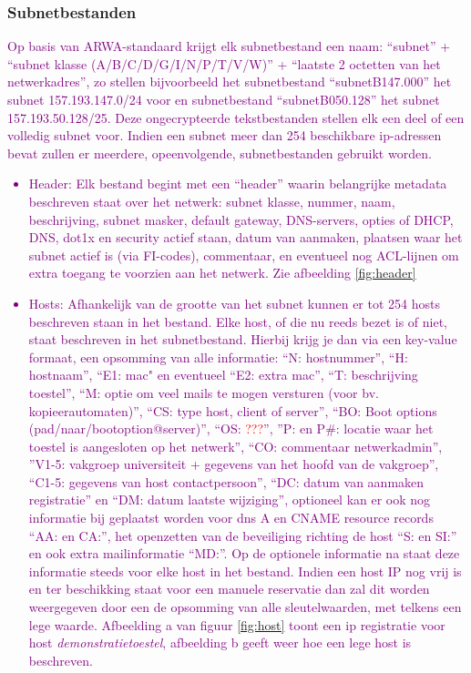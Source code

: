 \subsubsection{Subnetbestanden}
\label{subnetbestanden}
\textcolor{purple}{Op basis van ARWA-standaard krijgt elk subnetbestand een naam: “subnet” + “subnet klasse (A/B/C/D/G/I/N/P/T/V/W)” + “laatste 2 octetten van het netwerkadres”, zo stellen bijvoorbeeld het subnetbestand “subnetB147.000” het subnet 157.193.147.0/24 voor en subnetbestand “subnetB050.128” het subnet 157.193.50.128/25. Deze ongecrypteerde tekstbestanden stellen elk een deel of een volledig subnet voor. Indien een subnet meer dan 254 beschikbare \acrshort{ip}-adressen bevat zullen er meerdere, opeenvolgende, subnetbestanden gebruikt worden.}
\textcolor{purple}{
\begin{itemize}
    \item Header: Elk bestand begint met een “header” waarin belangrijke metadata beschreven staat over het netwerk: subnet klasse, nummer, naam, beschrijving, subnet masker, default gateway, DNS-servers, opties of DHCP, DNS, dot1x en security actief staan, datum van aanmaken, plaatsen waar het subnet actief is (via FI-codes), commentaar, en eventueel nog ACL-lijnen om extra toegang te voorzien aan het netwerk. Zie afbeelding \ref{fig:header}
    \item Hosts: Afhankelijk van de grootte van het subnet kunnen er tot 254 hosts beschreven staan in het bestand. Elke host, of die nu reeds bezet is of niet, staat beschreven in het subnetbestand. Hierbij krijg je dan via een key-value formaat, een opsomming van alle informatie: “N: hostnummer”, “H: hostnaam”, “E1: \acrshort{mac}" en eventueel “E2: extra \acrshort{mac}”, “T: beschrijving toestel”, “M: optie om veel mails te mogen versturen (voor bv. kopieerautomaten)”, “CS: type host, client of server”, “BO: Boot options (pad/naar/bootoption@server)”, “OS:  \textcolor{red}{???}”, ”P: en P#: locatie waar het toestel is aangesloten op het netwerk”, “CO: commentaar netwerkadmin”, ”V1-5: vakgroep universiteit + gegevens van het hoofd van de vakgroep”, “C1-5: gegevens van host contactpersoon”, “DC: datum van aanmaken registratie” en “DM: datum laatste wijziging”, optioneel kan er ook nog informatie bij geplaatst worden voor \acrshort{dns} A en CNAME resource records “AA: en CA:”, het openzetten van de beveiliging richting de host “S: en SI:” en ook extra mailinformatie “MD:”. Op de optionele informatie na staat deze informatie steeds voor elke host in het bestand. Indien een host \acrshort{IP} nog vrij is en ter beschikking staat voor een manuele reservatie dan zal dit worden weergegeven door een de opsomming van alle sleutelwaarden, met telkens een lege waarde. Afbeelding a van figuur \ref{fig:host} toont een \acrshort{ip} registratie voor host \textit{demonstratietoestel}, afbeelding b geeft weer hoe een lege host is beschreven.
\end{itemize}
}

